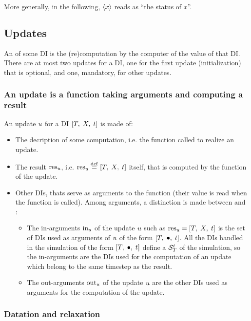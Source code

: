 More generally, in the following, $\left< x \right>$ reads as ``the status of $x$''.


\subsection{Updates}

An  of some DI is the (re)computation by the \CxSOM computer of the value of that DI. There are at most two updates for a DI, one for the first update (initialization) that is optional, and one, mandatory, for other updates.

\subsubsection{An update is a function taking arguments and computing a result \label{sec:update}}

An update $u$ for a DI $\left[ T,\;X,\;t \right]$ is made of:
\begin{itemize}
\item The decription of some computation, i.e. the function called to realize an update.
\item The result ${\mathrm{res}}_{u}$, i.e. ${{\mathrm{res}}_{u}}\;{\stackrel{\mathrm{def}}{=}}\;{\left[ T,\;X,\;t \right]}$ itself, that is computed by the function of the update.
\item Other DIs, thats serve as arguments to the function (their value is read when the function is called). Among arguments, a distinction is made between  and :
  \begin{itemize}
  \item The in-arguments ${\mathrm{in}}_{u}$ of the update $u$ such as ${{\mathrm{res}}_{u}} = {\left[ T,\;X,\;t \right]}$ is the set of DIs used as arguments of $u$ of the form $\left[ T,\;\bullet,\;t \right]$. All the DIs handled in the simulation of the form $\left[ T,\;\bullet,\;t \right]$ define a  ${{\cal S}}_{T}^{t}$ of the simulation, so the in-arguments are the DIs used for the computation of an update which belong to the same timestep as the result.
  \item The out-arguments  ${\mathrm{out}}_{u}$ of the update $u$ are the other DIs used as arguments for the computation of the update.
  \end{itemize}
\end{itemize}


\subsubsection{Datation and relaxation}

